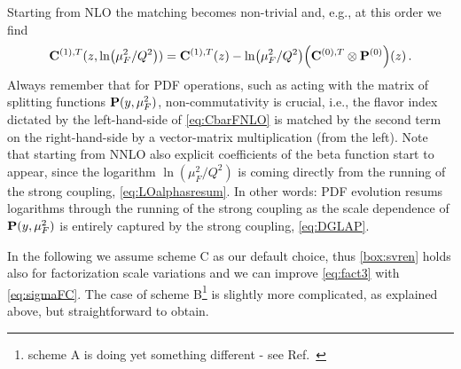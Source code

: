 Starting from NLO the matching becomes non-trivial and, e.g., at this order we find
\begin{equation}
    \vb C^{(1),T}(z,\ln(\mu_F^2/Q^2)) = \vb C^{(1),T}(z) -  \ln(\mu_F^2/Q^2) \qty(\vb C^{(0),T} \otimes \vb P^{(0)})(z)\,. \label{eq:CbarFNLO}
\end{equation}
Always remember that for PDF operations, such as acting with the matrix of splitting functions $\vb P(y,\mu_F^2)$, non-commutativity is crucial, i.e., the flavor index dictated by the left-hand-side of \cref{eq:CbarFNLO} is matched by the second term on the right-hand-side by a vector-matrix multiplication (from the left).
Note that starting from NNLO also explicit coefficients of the beta function start to appear, since the logarithm $\ln(\mu_F^2/Q^2)$ is coming directly from the running of the strong coupling, \cref{eq:LOalphasresum}.
In other words: PDF evolution resums logarithms through the running of the strong coupling as the scale dependence of $\vb P(y,\mu_F^2)$ is entirely captured by the strong coupling, \cref{eq:DGLAP}.

In the following we assume scheme C as our default choice, thus \cref{box:svren} holds also for factorization scale variations and we can improve \cref{eq:fact3} with \cref{eq:sigmaFC}.
The case of scheme B\footnote{scheme A is doing yet something different - see Ref.~\cite{NNPDF:2024dpb}} is slightly more complicated, as explained above, but straightforward to obtain.

